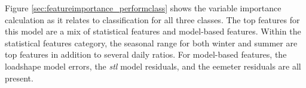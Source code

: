 Figure \ref{sec:featureimportance_performclass} shows the variable importance calculation as it relates to classification for all three classes. The top features for this model are a mix of statistical features and model-based features. Within the statistical features category, the seasonal range for both winter and summer are top features in addition to several daily ratios. For model-based features, the loadshape model errors, the \emph{stl} model residuals, and the eemeter residuals are all present.